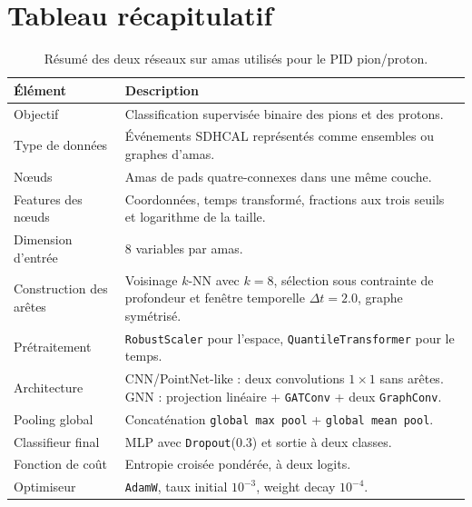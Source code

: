 \section{Tableau récapitulatif}

\begin{table}[H]
\centering
\caption{Résumé des deux réseaux sur amas utilisés pour le PID pion/proton.}
\begin{tabularx}{\textwidth}{>{\raggedright\arraybackslash}p{4.4cm}X}
\toprule
\textbf{Élément} & \textbf{Description} \\
\midrule

Objectif &
Classification supervisée binaire des pions et des protons. \\

Type de données &
Événements SDHCAL représentés comme ensembles ou graphes d'amas. \\

Nœuds &
Amas de pads quatre-connexes dans une même couche. \\

Features des nœuds &
Coordonnées, temps transformé, fractions aux trois seuils et logarithme de la taille. \\

Dimension d’entrée &
8 variables par amas. \\

Construction des arêtes &
Voisinage \(k\)-NN avec \(k=8\), sélection sous contrainte de profondeur et fenêtre temporelle \(\Delta t = 2.0\), graphe symétrisé. \\

Prétraitement &
\texttt{RobustScaler} pour l’espace, \texttt{QuantileTransformer} pour le temps. \\

Architecture &
CNN/PointNet-like : deux convolutions $1\!\times\!1$ sans arêtes. GNN : projection linéaire + \texttt{GATConv} + deux \texttt{GraphConv}. \\

Pooling global &
Concaténation \texttt{global max pool} + \texttt{global mean pool}. \\

Classifieur final &
MLP avec \texttt{Dropout}(0.3) et sortie à deux classes. \\

Fonction de coût &
Entropie croisée pondérée, à deux logits. \\

Optimiseur &
\texttt{AdamW}, taux initial \(10^{-3}\), weight decay \(10^{-4}\). \\


\end{tabularx}
\end{table}
